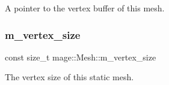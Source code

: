 A pointer to the vertex buffer of this mesh. \hypertarget{classmage_1_1_mesh_ab3ebdfffca054f32ac69e47c486d57b1}{}\label{classmage_1_1_mesh_ab3ebdfffca054f32ac69e47c486d57b1} 
\subsubsection{\texorpdfstring{m\+\_\+vertex\+\_\+size}{m\_vertex\_size}}
{\footnotesize\ttfamily const size\+\_\+t mage\+::\+Mesh\+::m\+\_\+vertex\+\_\+size\hspace{0.3cm}{\ttfamily [private]}}

The vertex size of this static mesh. 